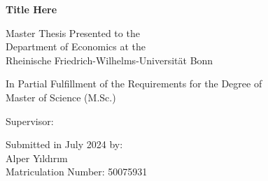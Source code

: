 \begin{titlepage}
    \begin{center}
        \vspace*{2cm}
            
        \LARGE
        \textbf{Title Here}
            
        \vspace{3cm}

        \large
        Master Thesis Presented to the \\ Department of Economics at the \\
        Rheinische Friedrich-Wilhelms-Universität Bonn

        \vspace{1.5cm}

        In Partial Fulfillment of the Requirements for the Degree of \\
        Master of Science (M.Sc.)

        \vfill

        Supervisor: 

        \vspace{1cm}

        Submitted in July 2024 by:\\
        Alper Yıldırım \\
        Matriculation Number: 50075931
            
    \end{center}
\end{titlepage}